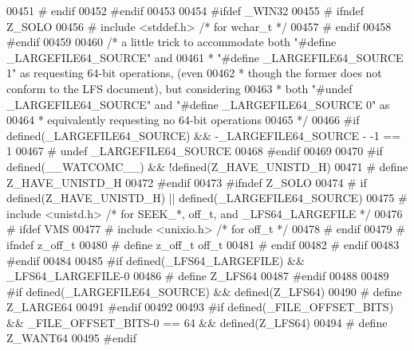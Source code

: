 \begin{DoxyCode}
00451 \textcolor{preprocessor}{#  endif}
00452 \textcolor{preprocessor}{#endif}
00453 
00454 \textcolor{preprocessor}{#ifdef \_WIN32}
00455 \textcolor{preprocessor}{#  ifndef Z\_SOLO}
00456 \textcolor{preprocessor}{#    include <stddef.h>}         \textcolor{comment}{/* for wchar\_t */}
00457 \textcolor{preprocessor}{#  endif}
00458 \textcolor{preprocessor}{#endif}
00459 
00460 \textcolor{comment}{/* a little trick to accommodate both "#define \_LARGEFILE64\_SOURCE" and}
00461 \textcolor{comment}{ * "#define \_LARGEFILE64\_SOURCE 1" as requesting 64-bit operations, (even}
00462 \textcolor{comment}{ * though the former does not conform to the LFS document), but considering}
00463 \textcolor{comment}{ * both "#undef \_LARGEFILE64\_SOURCE" and "#define \_LARGEFILE64\_SOURCE 0" as}
00464 \textcolor{comment}{ * equivalently requesting no 64-bit operations}
00465 \textcolor{comment}{ */}
00466 \textcolor{preprocessor}{#if defined(\_LARGEFILE64\_SOURCE) && -\_LARGEFILE64\_SOURCE - -1 == 1}
00467 \textcolor{preprocessor}{#  undef \_LARGEFILE64\_SOURCE}
00468 \textcolor{preprocessor}{#endif}
00469 
00470 \textcolor{preprocessor}{#if defined(\_\_WATCOMC\_\_) && !defined(Z\_HAVE\_UNISTD\_H)}
00471 \textcolor{preprocessor}{#  define Z\_HAVE\_UNISTD\_H}
00472 \textcolor{preprocessor}{#endif}
00473 \textcolor{preprocessor}{#ifndef Z\_SOLO}
00474 \textcolor{preprocessor}{#  if defined(Z\_HAVE\_UNISTD\_H) || defined(\_LARGEFILE64\_SOURCE)}
00475 \textcolor{preprocessor}{#    include <unistd.h>}         \textcolor{comment}{/* for SEEK\_*, off\_t, and \_LFS64\_LARGEFILE */}
00476 \textcolor{preprocessor}{#    ifdef VMS}
00477 \textcolor{preprocessor}{#      include <unixio.h>}       \textcolor{comment}{/* for off\_t */}
00478 \textcolor{preprocessor}{#    endif}
00479 \textcolor{preprocessor}{#    ifndef z\_off\_t}
00480 \textcolor{preprocessor}{#      define z\_off\_t off\_t}
00481 \textcolor{preprocessor}{#    endif}
00482 \textcolor{preprocessor}{#  endif}
00483 \textcolor{preprocessor}{#endif}
00484 
00485 \textcolor{preprocessor}{#if defined(\_LFS64\_LARGEFILE) && \_LFS64\_LARGEFILE-0}
00486 \textcolor{preprocessor}{#  define Z\_LFS64}
00487 \textcolor{preprocessor}{#endif}
00488 
00489 \textcolor{preprocessor}{#if defined(\_LARGEFILE64\_SOURCE) && defined(Z\_LFS64)}
00490 \textcolor{preprocessor}{#  define Z\_LARGE64}
00491 \textcolor{preprocessor}{#endif}
00492 
00493 \textcolor{preprocessor}{#if defined(\_FILE\_OFFSET\_BITS) && \_FILE\_OFFSET\_BITS-0 == 64 && defined(Z\_LFS64)}
00494 \textcolor{preprocessor}{#  define Z\_WANT64}
00495 \textcolor{preprocessor}{#endif}

\end{DoxyCode}
